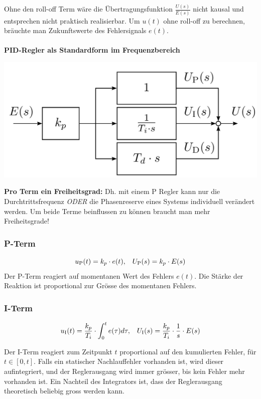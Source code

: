        Ohne den roll-off Term wäre die Übertragungsfunktion $\frac{U(s)}{E(s)}$ nicht kausal und entsprechen nicht praktisch realisierbar. Um $u(t)$ ohne roll-off zu berechnen, bräuchte man Zukunftswerte des Fehlersignals $e(t)$.\\\\
        \textbf{PID-Regler als Standardform im Frequenzbereich}
        \begin{center}
            \includegraphics[width = 0.6\linewidth]{images/09/PID-regler.jpg}
        \end{center}
        
        \textbf{Pro Term ein Freiheitsgrad:} Dh. mit einem P Regler kann nur die Durchtrittsfrequenz \textit{ODER} die Phasenreserve eines Systems individuell verändert werden. Um beide Terme beinflussen zu können braucht man mehr Freiheitsgrade!
        
    \subsubsection{P-Term}
        \[
        u_\textrm{P}(t)= k_p\cdot e(t), \hspace{3mm} U_\textrm{P}(s) = k_p\cdot E(s)
        \]
        Der P-Term reagiert auf momentanen Wert des Fehlers $e(t)$. Die Stärke der Reaktion ist proportional zur Grösse des momentanen Fehlers.
    \subsubsection{I-Term}
        \[
        u_\textrm{I}(t) = \frac{k_p}{T_i}\cdot\int_0^te(\tau)d\tau, \hspace{3mm} U_\textrm{I}(s)=\frac{k_p}{T_i}\cdot\frac{1}{s}\cdot E(s)
        \]
        
        Der I-Term reagiert zum Zeitpunkt $t$ proportional auf den kumulierten Fehler, für $t\in[0,t]$. Falls ein statischer Nachlauffehler vorhanden ist, wird dieser aufintegriert, und der Reglerausgang wird immer grösser, bis kein Fehler mehr vorhanden ist. Ein Nachteil des Integrators ist, dass der Reglerausgang theoretisch beliebig gross werden kann.
        
